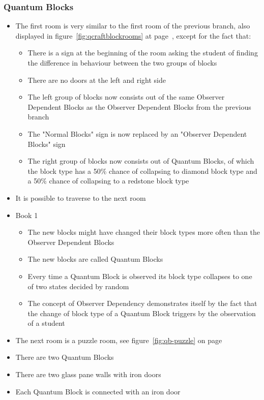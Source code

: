 \documentclass[11pt,twoside]{report} %
\begin{document}
\subsubsection{Quantum Blocks}
\begin{itemize}
	\item The first room is very similar to the first room of the previous branch, also displayed in figure~\ref{fig:qcraftblockrooms} at page~\pageref{fig:qcraftblockrooms}, except for the fact that:
	\begin{itemize}
		\item There is a sign at the beginning of the room asking the student of finding the difference in behaviour between the two groups of blocks
		\item There are no doors at the left and right side
		\item The left group of blocks now consists out of the same Observer Dependent Blocks as the Observer Dependent Blocks from the previous branch
		\item The "Normal Blocks" sign is now replaced by an "Observer Dependent Blocks" sign
		\item The right group of blocks now consists out of Quantum Blocks, of which the block type has a 50\% chance of collapsing to diamond block type and a 50\% chance of collapsing to a redstone block type
	\end{itemize}
	\item It is possible to traverse to the next room
	\item Book 1
	\begin{itemize}
		\item The new blocks might have changed their block types more often than the Observer Dependent Blocks
		\item The new blocks are called Quantum Blocks
		\item Every time a Quantum Block is observed its block type collapses to one of two states decided by random
		\item The concept of Observer Dependency demonstrates itself by the fact that the change of block type of a Quantum Block triggers by the observation of a student
	\end{itemize}
	\item The next room is a puzzle room, see figure~\ref{fig:qb-puzzle} on page~\pageref{fig:qb-puzzle}
	\item There are two Quantum Blocks
	\item There are two glass pane walls with iron doors
	\item Each Quantum Block is connected with an iron door

\end{itemize}
\end{document}
